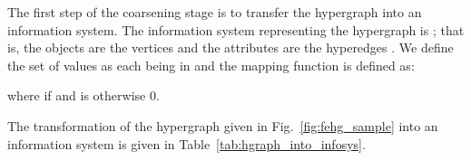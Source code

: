 \documentclass[twocolumn]{svjour3}          \smartqed
\begin{document}
The first step of the coarsening stage is to transfer the hypergraph  into an information system. The information system representing the hypergraph is ; that is, the objects are the vertices and the attributes are the hyperedges . We define the set of values as each being in  and the mapping function is defined as:

where  if  and is otherwise 0.


The transformation of the hypergraph given in Fig.~\ref{fig:fehg_sample} into an information system is given in Table~\ref{tab:hgraph_into_infosys}. 

\begin{table*}[ht]
	\centering
	\captionsetup{labelfont=bf}
	\caption{The transformation of the hypergraph  depicted in Fig.~\ref{fig:fehg_sample} into an information system. The values are rounded to 2 decimal places. } \label{tab:hgraph_into_infosys}
\end{table*}
\end{document}
